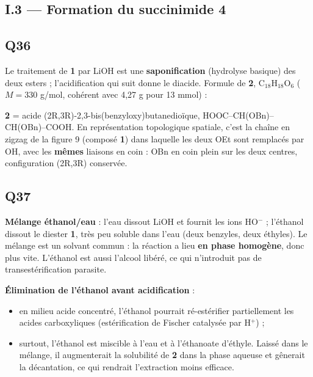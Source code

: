 \documentclass[11pt,a4paper]{article}
\providecommand{\tightlist}{\setlength{\itemsep}{0pt}\setlength{\parskip}{0pt}}
\begin{document}
\hypertarget{i.3-formation-du-succinimide-4}{%
\subsection{I.3 --- Formation du succinimide 4}\label{i.3-formation-du-succinimide-4}}

\hypertarget{q36}{%
\subsection{Q36}\label{q36}}

Le traitement de \textbf{1} par LiOH est une \textbf{saponification} (hydrolyse basique) des deux esters ; l'acidification qui suit donne le diacide. Formule de \textbf{2}, C\(_{18}\)H\(_{18}\)O\(_6\) (\(M=330\) g/mol, cohérent avec 4,27 g pour 13 mmol) :

\textbf{2} = acide (2R,3R)-\allowbreak{}2,3-\allowbreak{}bis(benzyloxy)butanedioïque, HOOC--\allowbreak{}CH(OBn)--\allowbreak{}CH(OBn)--\allowbreak{}COOH. En représentation topologique spatiale, c'est la chaîne en zigzag de la figure 9 (composé \textbf{1}) dans laquelle les deux OEt sont remplacés par OH, avec les \textbf{mêmes} liaisons en coin : OBn en coin plein sur les deux centres, configuration (2R,3R) conservée.

\hypertarget{q37}{%
\subsection{Q37}\label{q37}}

\textbf{Mélange éthanol/eau} : l'eau dissout LiOH et fournit les ions HO\(^-\) ; l'éthanol dissout le diester \textbf{1}, très peu soluble dans l'eau (deux benzyles, deux éthyles). Le mélange est un solvant commun : la réaction a lieu \textbf{en phase homogène}, donc plus vite. L'éthanol est aussi l'alcool libéré, ce qui n'introduit pas de transestérification parasite.

\textbf{Élimination de l'éthanol avant acidification} :

\begin{itemize}
\tightlist
\item
  en milieu acide concentré, l'éthanol pourrait ré-estérifier partiellement les acides carboxyliques (estérification de Fischer catalysée par H\(^+\)) ;
\item
  surtout, l'éthanol est miscible à l'eau et à l'éthanoate d'éthyle. Laissé dans le mélange, il augmenterait la solubilité de \textbf{2} dans la phase aqueuse et gênerait la décantation, ce qui rendrait l'extraction moins efficace.
\end{itemize}
\end{document}

